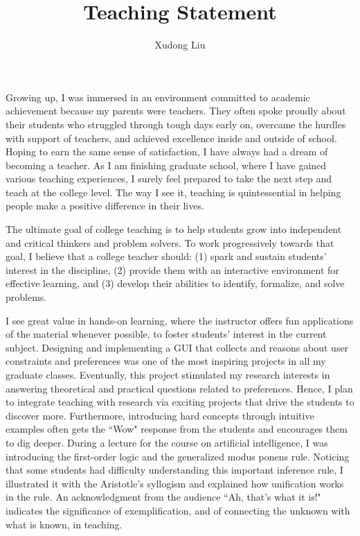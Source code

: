 \documentclass[12pt]{article}
\title{Teaching Statement}
\author{Xudong Liu}
\date{}
\begin{document}
\maketitle%

Growing up, I was immersed in an environment committed to academic achievement
because my parents were teachers.
They often spoke proudly about their students who
struggled through tough days early on, overcame the hurdles with support of teachers, and 
achieved excellence inside and outside of school. 
Hoping to earn the same sense of satisfaction, I have always had a dream of becoming a teacher.
As I am finishing graduate school, where I have gained various teaching experiences,
I surely feel prepared to take the next step and teach at the college level.
The way I see it,
teaching is quintessential in helping people make a positive difference in their lives.

The ultimate goal of college teaching is to help students grow into independent 
and critical thinkers and problem solvers.
To work progressively towards that goal, I believe that a college teacher should:
(1) spark and sustain students' interest in the discipline,
(2) provide them with an interactive environment for effective learning, and
(3) develop their abilities to identify, formalize,
and solve problems.

I see great value in hands-on learning, where the instructor offers fun
applications of the material whenever possible,
to foster students' interest in the current subject.
Designing and implementing a GUI that collects and reasons about user constraints and preferences
was one of the most inspiring projects in all my graduate classes.
Eventually, this project stimulated my research interests in answering theoretical and
practical questions related to preferences.
Hence, I plan to integrate teaching with research via exciting projects that
drive the students to discover more.
Furthermore, introducing hard concepts through intuitive examples often
gets the ``Wow" response from the students and
encourages them to dig deeper.
During a lecture for the course on artificial intelligence,
I was introducing the first-order logic and the generalized modus ponens
rule.  Noticing that some students had difficulty understanding this
important inference rule, I illustrated it with the 
Aristotle's syllogism and explained how unification works in the rule.
An acknowledgment from the audience ``Ah, that's what it is!" indicates
the significance of exemplification, and of connecting the unknown with
what is known, in teaching.
\end{document}
